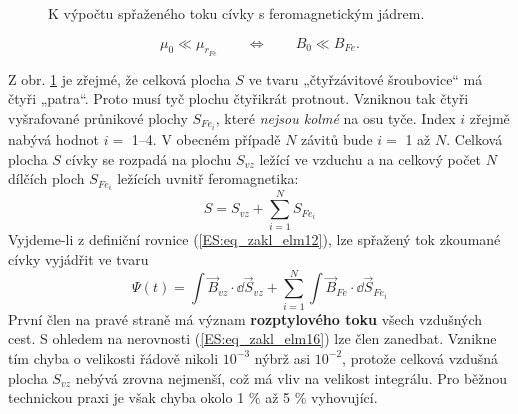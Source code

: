       \begin{figure}[ht!]
        \centering  
        \caption{K výpočtu spřaženého toku cívky s feromagnetickým jádrem. \cite[s.~17]{Patocka4}} 
        \label{teo:fig049}
      \end{figure}

      \begin{equation}\label{ES:eq_zakl_elm16}
        \mu_0\ll\mu_{r_{Fe}}\qquad\Longleftrightarrow\qquad B_0\ll B_{Fe}. 
      \end{equation}
      
      Z obr.  \ref{teo:fig049} je zřejmé, že celková plocha \(S\) ve tvaru 
      „čtyřzávitové šroubovice“ má čtyři „patra“. Proto musí tyč plochu čtyřikrát protnout. 
      Vzniknou tak čtyři vyšrafované průnikové plochy \(S_{Fe_i}\), které \emph{nejsou kolmé} na 
      osu tyče. Index \(i\) zřejmě nabývá hodnot \(i =\) \numrange{1}{4}. V obecném případě \(N\) 
      závitů bude \(i =\) \num{1} až \(N\). Celková plocha \(S\) cívky se rozpadá na plochu 
      \(S_{vz}\) ležící ve vzduchu a na celkový počet \(N\) dílčích ploch \(S_{Fe_i}\) ležících 
      uvnitř feromagnetika:
      \begin{equation}\label{ES:eq_zakl_elm17}
        S = S_{vz} + \sum\limits_{i=1}^{N}S_{Fe_i} 
      \end{equation}
      Vyjdeme-li z definiční rovnice (\ref{ES:eq_zakl_elm12}), lze spřažený tok zkoumané cívky 
      vyjádřit ve tvaru
      \begin{equation}\label{ES:eq_zakl_elm18}
         \Psi(t) = \int \vec{B}_{vz}\cdot \dd{\vec{S}}_{vz} + 
                   \sum_{i=1}^{N}\int\vec{B}_{Fe}\cdot \dd{\vec{S}}_{Fe_i}
      \end{equation}
      První člen na pravé straně má význam \textbf{rozptylového toku} všech vzdušných cest. S 
      ohledem na nerovnosti (\ref{ES:eq_zakl_elm16}) lze člen zanedbat. Vznikne tím chyba o 
      velikosti řádově nikoli \(10^{-3}\) nýbrž asi \(10^{-2}\), protože celková vzdušná plocha 
      \(S_{vz}\) nebývá zrovna nejmenší, což má vliv na velikost integrálu. Pro běžnou technickou 
      praxi je však chyba okolo 1 \% až 5 \% vyhovující.
      
